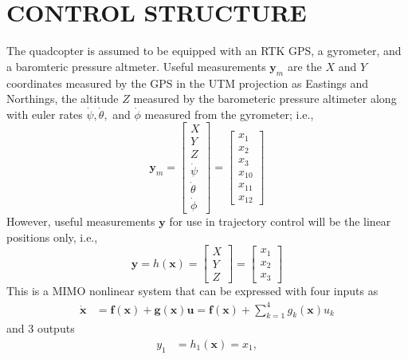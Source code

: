 \documentclass[twocolumn,10pt]{asme2e}
\begin{document}
{\section*{CONTROL STRUCTURE}
The quadcopter is assumed to be equipped with an RTK GPS, a gyrometer, and a baromteric pressure altmeter. Useful measurements $\textbf{y}_m$ are the  $X$ and $Y$ coordinates measured by the GPS in the UTM projection as Eastings and Northings, the altitude $Z$  measured by the barometeric pressure altimeter along with euler rates $\dot{\psi}, \dot{\theta},$ and $\dot{\phi}$ measured from the gyrometer; i.e.,
\begin{equation}\textbf{y}_m=\left[\begin{array}{c}
		X\\
		Y\\
		Z\\
		\dot{\psi}\\ 
		\dot{\theta}\\
		\dot{\phi}
	\end{array}\right]=\left[\begin{array}{c}
		x_1\\
		x_2\\
		x_3\\
		x_{10}\\
		x_{11}\\
		x_{12}
	\end{array}\right]\end{equation}
However, useful measurements $\textbf{y}$ for use in trajectory control  will be the linear positions only, i.e.,
\begin{equation}\textbf{y}=h(\textbf{x})=\left[\begin{array}{c}
	X\\
	Y\\
	Z
\end{array}\right]=\left[\begin{array}{c}
x_1\\
x_2\\
x_3
\end{array}\right]\end{equation}
This is a MIMO nonlinear system  that can be expressed with four inputs as
\begin{align}\dot{\textbf{x}}&=\textbf{f}(\textbf{x})+\textbf{g}(\textbf{x})\textbf{u}=\textbf{f}(\textbf{x})+\sum_{k=1}^4 g_k(\textbf{x})u_k\end{align}
and 3 outputs 
\begin{align}
y_1 &= h_1(\textbf{x})=x_1,\\

\end{align}}
\end{document}
